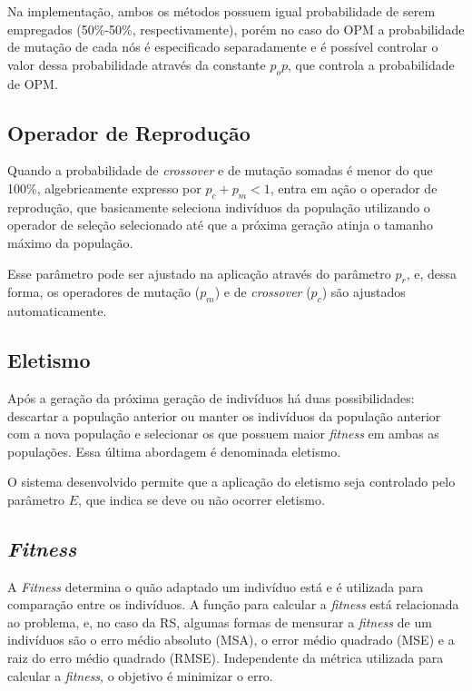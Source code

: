 \documentclass[a4paper]{paper}
\begin{document}
Na implementação, ambos os métodos possuem igual probabilidade de serem
empregados (50\%-50\%, respectivamente), porém no caso do OPM a probabilidade de
mutação de cada nós é especificado separadamente e é possível controlar o valor
dessa probabilidade através da constante $p_op$, que controla a probabilidade de
OPM.

\subsection{Operador de Reprodução} \label{subsec:reproduction}

Quando a probabilidade de \textit{crossover} e de mutação somadas é menor do que
100\%, algebricamente expresso por $p_c + p_m < 1$, entra em ação o operador
de reprodução, que basicamente seleciona indivíduos da população utilizando
o operador de seleção selecionado até que a próxima geração atinja o tamanho
máximo da população.

Esse parâmetro pode ser ajustado na aplicação através do parâmetro $p_r$, e,
dessa forma, os operadores de mutação ($p_m$) e de \textit{crossover} ($p_c$)
são ajustados automaticamente.

\subsection{Eletismo}

Após a geração da próxima geração de indivíduos há duas possibilidades:
descartar a população anterior ou manter os indivíduos da população anterior
com a nova população e selecionar os que possuem maior \textit{fitness} em ambas
as populações. Essa última abordagem é denominada eletismo.

O sistema desenvolvido permite que a aplicação do eletismo seja controlado pelo
parâmetro $E$, que indica se deve ou não ocorrer eletismo.

\subsection{\textit{Fitness}}

A \textit{Fitness} determina o quão adaptado um indivíduo está e é utilizada
para comparação entre os indivíduos. A função para calcular a \textit{fitness}
está relacionada ao problema, e, no caso da RS, algumas formas de mensurar a
\textit{fitness} de um indivíduos são o erro médio absoluto (MSA), o error médio
quadrado (MSE) e a raiz do erro médio quadrado (RMSE). Independente da métrica
utilizada para calcular a \textit{fitness}, o objetivo é minimizar o erro.
\end{document}
